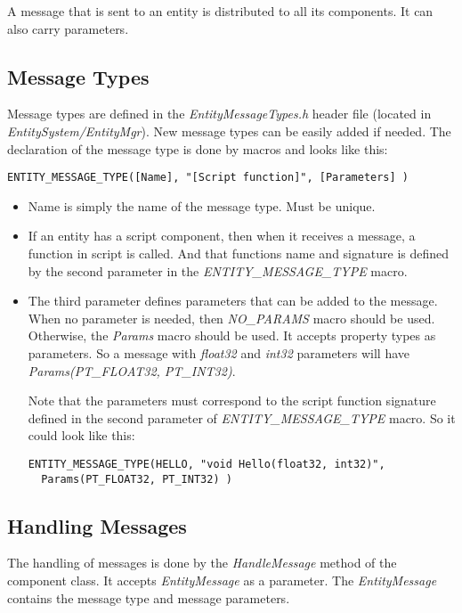 \documentclass[a4paper, 12pt]{report}
\begin{document}
A message that is sent to an entity is distributed to all its components. It can also carry parameters.

\subsection{Message Types}
Message types are defined in the \emph{EntityMessageTypes.h} header file (located in \emph{EntitySystem/EntityMgr}). New message types can be easily added if needed. The declaration of the message type is done by macros and looks like this:

\footnotesize 
\begin{verbatim}
ENTITY_MESSAGE_TYPE([Name], "[Script function]", [Parameters] )
\end{verbatim}
\normalsize

\begin{itemize}
\item
Name is simply the name of the message type. Must be unique.
\item
If an entity has a script component, then when it receives a message, a function in script is called. And that functions name and signature is defined by the second parameter in the \emph{ENTITY\_MESSAGE\_TYPE} macro.
\item
The third parameter defines parameters that can be added to the message. When no parameter is needed, then \emph{NO\_PARAMS} macro should be used. Otherwise, the \emph{Params} macro should be used. It accepts property types as parameters. So a message with  \emph{float32} and  \emph{int32} parameters will have \emph{Params(PT\_FLOAT32, PT\_INT32)}.

Note that the parameters must correspond to the script function signature defined in the second parameter of \emph{ENTITY\_MESSAGE\_TYPE} macro. So it could look like this: 

\footnotesize 
\begin{verbatim}
ENTITY_MESSAGE_TYPE(HELLO, "void Hello(float32, int32)",
  Params(PT_FLOAT32, PT_INT32) )
\end{verbatim}
\normalsize

\end{itemize}

\subsection{Handling Messages}

 The handling of messages is done by the \emph{HandleMessage} method of the component class. It accepts \emph{EntityMessage} as a parameter. The \emph{EntityMessage} contains the message type and message parameters. 
\end{document}
